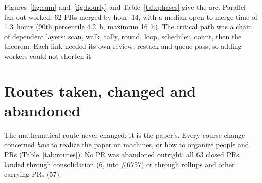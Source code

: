\documentclass[11pt]{article}
\newcommand{\pr}[1]{\href{https://github.com/cslib-community/cslib-frontier/pull/#1}{\##1}}
\begin{document}
Figures~\ref{fig:cum} and~\ref{fig:hourly} and Table~\ref{tab:phases} give the arc. Parallel
fan-out worked: 62 PRs merged by hour~14, with a median open-to-merge time of 1.3~hours (90th
percentile 4.2~h, maximum 16~h). The critical path was a chain of dependent layers: scan, walk,
tally, round, loop, scheduler, count, then the theorem. Each link needed its own review, restack
and queue pass, so adding workers could not shorten it.

\section{Routes taken, changed and abandoned}
\label{sec:routes}

The mathematical route never changed; it is the paper's. Every course change concerned
\emph{how} to realize the paper on machines, or how to organize people and PRs
(Table~\ref{tab:routes}). No PR was abandoned outright: all 63 closed PRs landed through
consolidation (6, into \pr{6757}) or through rollups and other carrying PRs (57).
\end{document}
